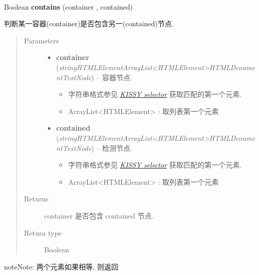 \documentclass[letterpaper,10pt,english]{sphinxmanual}
\begin{document}
\begin{fulllineitems}
\label{api/core/dom/contains:DOM.contains}~
\begin{DUlineblock}{0em}
\item[] Boolean \textbf{contains} (container , contained)
\item[] 判断某一容器(container)是否包含另一(contained)节点.
\end{DUlineblock}
\begin{quote}\begin{description}
\item[{Parameters}] \leavevmode\begin{itemize}
\item {}
\textbf{container} (\emph{string\textbar{}HTMLElement\textbar{}ArrayList\textless{}HTMLElement\textgreater{}\textbar{}HTMLDcoument\textbar{}TextNode}) --
容器节点.
\begin{itemize}
\item {}
字符串格式参见 {\hyperref[api/core/dom/selector:dom-selector]{\emph{KISSY selector}}} 获取匹配的第一个元素.

\item {}
ArrayList\textless{}HTMLElement\textgreater{} : 取列表第一个元素

\end{itemize}


\item {}
\textbf{contained} (\emph{string\textbar{}HTMLElement\textbar{}ArrayList\textless{}HTMLElement\textgreater{}\textbar{}HTMLDcoument\textbar{}TextNode}) --
检测节点.
\begin{itemize}
\item {}
字符串格式参见 {\hyperref[api/core/dom/selector:dom-selector]{\emph{KISSY selector}}} 获取匹配的第一个元素.

\item {}
ArrayList\textless{}HTMLElement\textgreater{} : 取列表第一个元素

\end{itemize}


\end{itemize}

\item[{Returns}] \leavevmode
container 是否包含 contained 节点.

\item[{Return type}] \leavevmode
Boolean

\end{description}\end{quote}

\begin{notice}{note}{Note:}
两个元素如果相等, 则返回 
\end{notice}

\end{fulllineitems}
\end{document}
